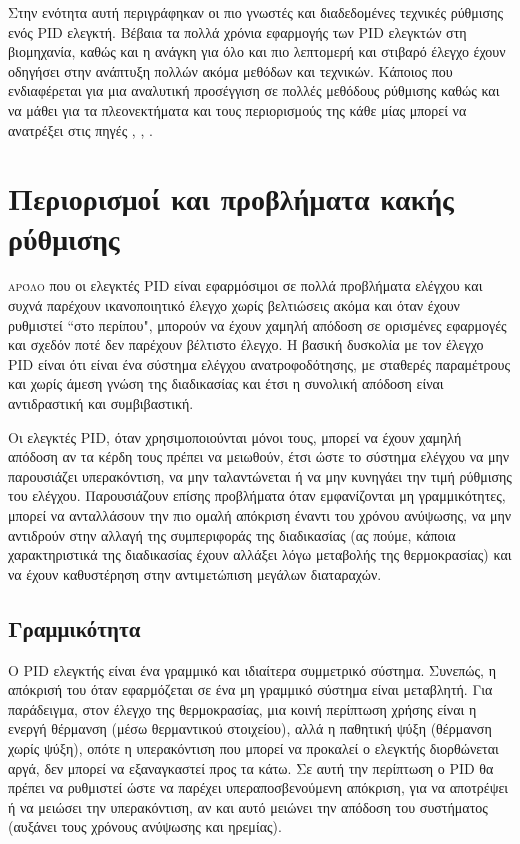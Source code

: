 Στην ενότητα αυτή περιγράφηκαν οι πιο γνωστές και διαδεδομένες τεχνικές ρύθμισης ενός PID ελεγκτή. Βέβαια τα πολλά χρόνια εφαρμογής των PID ελεγκτών στη βιομηχανία, καθώς και η ανάγκη για όλο και πιο λεπτομερή και στιβαρό έλεγχο έχουν οδηγήσει στην ανάπτυξη πολλών ακόμα μεθόδων και τεχνικών.
Κάποιος που ενδιαφέρεται για μια αναλυτική προσέγγιση σε πολλές μεθόδους ρύθμισης καθώς και να μάθει για τα πλεονεκτήματα και τους περιορισμούς της κάθε μίας μπορεί να ανατρέξει στις πηγές \cite{astrom}, \cite{yun}, \cite{kristian}.

\section{Περιορισμοί και προβλήματα κακής ρύθμισης}

\lettrine[findent=2pt]{}{αρόλο} που οι ελεγκτές PID είναι εφαρμόσιμοι σε πολλά προβλήματα ελέγχου και συχνά παρέχουν ικανοποιητικό έλεγχο χωρίς βελτιώσεις ακόμα και όταν έχουν ρυθμιστεί ``στο περίπου", μπορούν να έχουν χαμηλή απόδοση σε ορισμένες εφαρμογές και σχεδόν ποτέ δεν παρέχουν βέλτιστο έλεγχο. Η βασική δυσκολία με τον έλεγχο PID είναι ότι είναι ένα σύστημα ελέγχου ανατροφοδότησης, με σταθερές παραμέτρους και χωρίς άμεση γνώση της διαδικασίας και έτσι η συνολική απόδοση είναι αντιδραστική και συμβιβαστική.

Οι ελεγκτές PID, όταν χρησιμοποιούνται μόνοι τους, μπορεί να έχουν χαμηλή απόδοση αν τα κέρδη τους πρέπει να μειωθούν, έτσι ώστε το σύστημα ελέγχου να μην παρουσιάζει υπερακόντιση, να μην ταλαντώνεται ή να μην κυνηγάει την τιμή ρύθμισης του ελέγχου. Παρουσιάζουν επίσης προβλήματα όταν εμφανίζονται μη γραμμικότητες, μπορεί να ανταλλάσουν την πιο ομαλή απόκριση έναντι του χρόνου ανύψωσης, να μην αντιδρούν στην αλλαγή της συμπεριφοράς της διαδικασίας (ας πούμε, κάποια χαρακτηριστικά της διαδικασίας έχουν αλλάξει λόγω μεταβολής της θερμοκρασίας) και να έχουν καθυστέρηση στην αντιμετώπιση μεγάλων διαταραχών.

\subsection{Γραμμικότητα}

Ο PID ελεγκτής είναι ένα γραμμικό και ιδιαίτερα συμμετρικό σύστημα. Συνεπώς, η απόκρισή του όταν εφαρμόζεται σε ένα μη γραμμικό σύστημα είναι μεταβλητή. Για παράδειγμα, στον έλεγχο της θερμοκρασίας, μια κοινή περίπτωση χρήσης είναι η ενεργή θέρμανση (μέσω θερμαντικού στοιχείου), αλλά η παθητική ψύξη (θέρμανση χωρίς ψύξη), οπότε η υπερακόντιση που μπορεί να προκαλεί ο ελεγκτής διορθώνεται αργά, δεν μπορεί να εξαναγκαστεί προς τα κάτω. Σε αυτή την περίπτωση ο PID θα πρέπει να ρυθμιστεί ώστε να παρέχει υπεραποσβενούμενη απόκριση, για να αποτρέψει ή να μειώσει την υπερακόντιση, αν και αυτό μειώνει την απόδοση του συστήματος (αυξάνει τους χρόνους ανύψωσης και ηρεμίας).

